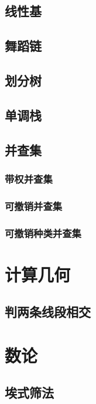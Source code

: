 \documentclass[10pt,a4paper]{article}
\begin{document}
\subsection{线性基}

\subsection{舞蹈链}

\subsection{划分树}

\subsection{单调栈}
\begin{spacing}{1.5}

\end{spacing}
\subsection{并查集}
\subsubsection{带权并查集}

\subsubsection{可撤销并查集}

\subsubsection{可撤销种类并查集}

\section{计算几何}
\subsection{判两条线段相交}

\section{数论}
\subsection{埃式筛法}

\end{document}
